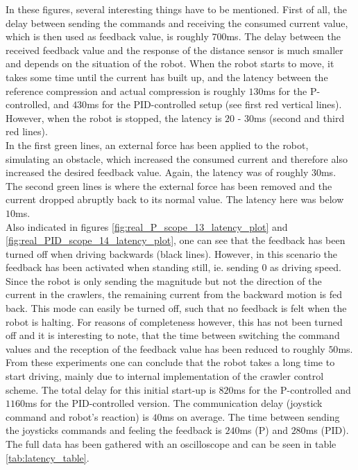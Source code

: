 In these figures, several interesting things have to be mentioned. First of all, the delay between sending the commands and receiving the consumed current value, which is then used as feedback value, is roughly $700$ms. The delay between the received feedback value and the response of the distance sensor is much smaller and depends on the situation of the robot. When the robot starts to move, it takes some time until the current has built up, and the latency between the reference compression and actual compression is roughly $130$ms for the P-controlled, and $430$ms for the PID-controlled setup (see first red vertical lines). However, when the robot is stopped, the latency is $20$ - $30$ms (second and third red lines).\\
In the first green lines, an external force has been applied to the robot, simulating an obstacle, which increased the consumed current and therefore also increased the desired feedback value. Again, the latency was of roughly $30$ms. The second green lines is where the external force has been removed and the current dropped abruptly back to its normal value. The latency here was below $10$ms.\\
Also indicated in figures \ref{fig:real_P_scope_13_latency_plot} and \ref{fig:real_PID_scope_14_latency_plot}, one can see that the feedback has been turned off when driving backwards (black lines). However, in this scenario the feedback has been activated when standing still, ie. sending $0$ as driving speed. Since the robot is only sending the magnitude but not the direction of the current in the crawlers, the remaining current from the backward motion is fed back. This mode can easily be turned off, such that no feedback is felt when the robot is halting. For reasons of completeness however, this has not been turned off and it is interesting to note, that the time between switching the command values and the reception of the feedback value has been reduced to roughly $50$ms. \\
From these experiments one can conclude that the robot takes a long time to start driving, mainly due to internal implementation of the crawler control scheme. The total delay for this initial start-up is $820$ms for the P-controlled and $1160$ms for the PID-controlled version. The communication delay (joystick command and robot's reaction) is $40$ms on average. The time between sending the joysticks commands and feeling the feedback is $240$ms (P) and $280$ms (PID). The full data has been gathered with an oscilloscope and can be seen in table \ref{tab:latency_table}.

